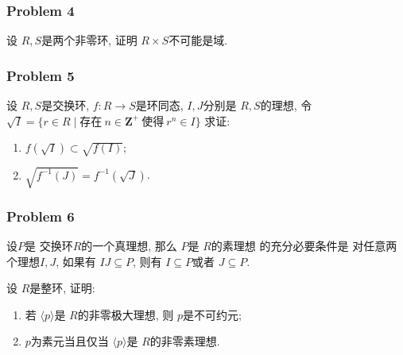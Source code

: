 \documentclass[a4paper,12pt]{ctexart}
\newcommand{\Z}{\mathbf{Z}}
\begin{document}
\subsubsection*{Problem 4}
    设 $ R,S $是两个非零环, 证明 $ R\times S $不可能是域.
\subsubsection*{Problem 5}
    设 $ R,S $是交换环, $ f:R\rightarrow S $是环同态, $ I,J $分别是 $ R,S $的理想, 令 $ \sqrt{I}=\{r\in R\mid \text{存在}~n\in\Z^+~\text{使得}~r^n\in I\} $ 求证:
    \begin{enumerate}
      \item $ f(\sqrt{I})\subset \sqrt{f(I)} $;
      \item $ \sqrt{f^{-1}(J)}=f^{-1}(\sqrt{J}) $.
    \end{enumerate}
\subsubsection*{Problem 6}
    设$ P $是 交换环$ R $的一个真理想, 那么 $ P $是 $ R $的素理想 的充分必要条件是 对任意两个理想$ I,J $, 如果有 $ IJ\subseteq P $, 则有 $ I\subseteq P $或者 $ J\subseteq P $.  
    
    设 $ R $是整环, 证明:
    \begin{enumerate}
      \item 若 $ \langle p\rangle $是 $ R $的非零极大理想, 则 $ p $是不可约元;
      \item $ p $为素元当且仅当 $ \langle p\rangle $是 $ R $的非零素理想.
    \end{enumerate}
\end{document}
